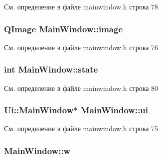 См. определение в файле mainwindow.\+h строка 78

\subsubsection[{\texorpdfstring{image}{image}}]{\setlength{\rightskip}{0pt plus 5cm}Q\+Image Main\+Window\+::image\hspace{0.3cm}{\ttfamily [private]}}\hypertarget{class_main_window_a66a1d5b734bad3d2e9e2db622b9950b4}{}\label{class_main_window_a66a1d5b734bad3d2e9e2db622b9950b4}


См. определение в файле mainwindow.\+h строка 76

\subsubsection[{\texorpdfstring{state}{state}}]{\setlength{\rightskip}{0pt plus 5cm}int Main\+Window\+::state\hspace{0.3cm}{\ttfamily [private]}}\hypertarget{class_main_window_aa2b6e7a3cfbc2bffb42aa8c74c37ef2b}{}\label{class_main_window_aa2b6e7a3cfbc2bffb42aa8c74c37ef2b}


См. определение в файле mainwindow.\+h строка 80

\subsubsection[{\texorpdfstring{ui}{ui}}]{\setlength{\rightskip}{0pt plus 5cm}Ui\+::\+Main\+Window$\ast$ Main\+Window\+::ui\hspace{0.3cm}{\ttfamily [private]}}\hypertarget{class_main_window_a35466a70ed47252a0191168126a352a5}{}\label{class_main_window_a35466a70ed47252a0191168126a352a5}


См. определение в файле mainwindow.\+h строка 75

\subsubsection[{\texorpdfstring{w}{w}}]{ Main\+Window\+::w\hspace{0.3cm}{\ttfamily [private]}}\hypertarget{class_main_window_aeb8f8bc8e591c09d7c2bd5d3e4a754dc}{}\label{class_main_window_aeb8f8bc8e591c09d7c2bd5d3e4a754dc}


